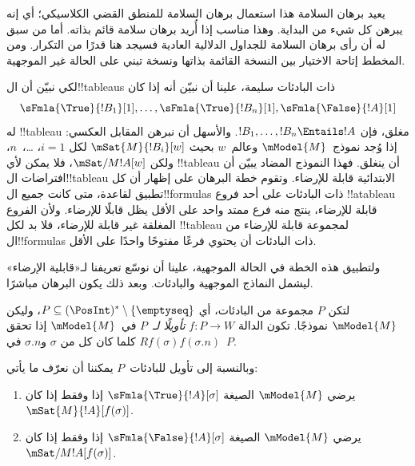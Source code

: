 \documentclass[../../../include/open-logic-section]{subfiles}
\begin{document}


\begin{editorial}
  يعيد برهان السلامة هذا استعمال برهان السلامة للمنطق القضي الكلاسيكي؛
  أي إنه يبرهن كل شيء من البداية. وهذا مناسب إذا أُريد برهان سلامة
  قائم بذاته. أما من سبق له أن رأى برهان السلامة للجداول الدلالية
  العادية فسيجد هنا قدرًا من التكرار. ومن المخطط إتاحة الاختيار بين
  النسخة القائمة بذاتها ونسخة تبني على الحالة غير الموجهية.
\end{editorial}

\begin{explain}
  لكي نبيّن أن ال!!{tableau}s ذات البادئات سليمة، علينا أن نبيّن أنه إذا
  كان
  \[
  \sFmla{\True}{!B_1}[1], \dots, \sFmla{\True}{!B_n}[1], \sFmla{\False}{!A}[1]
  \]
  له !!{tableau} مغلق، فإن $!B_1, \dots, !B_n \Entails !A$. والأسهل
  أن نبرهن المقابل العكسي: إذا وُجد نموذج~$\mModel{M}$ وعالم~$w$ بحيث
  $\mSat{M}{!B_i}[w]$ لكل $i=1$، \dots،~$n$، ولكن
  $\mSat/{M}{!A}[w]$، فلا يمكن لأي !!{tableau} أن ينغلق. فهذا النموذج
  المضاد يبيّن أن افتراضات ال!!{tableau} الابتدائية قابلة للإرضاء.
  وتقوم خطة البرهان على إظهار أن كل تطبيق لقاعدة، متى كانت جميع
  ال!!{formula}s ذات البادئات على أحد فروع !!a{tableau} قابلة للإرضاء،
  ينتج منه فرع ممتد واحد على الأقل يظل قابلًا للإرضاء. ولأن الفروع
  المغلقة غير قابلة للإرضاء، فلا بد لكل !!{tableau} لمجموعة قابلة
  للإرضاء من ال!!{formula}s ذات البادئات أن يحتوي فرعًا مفتوحًا واحدًا
  على الأقل.

  ولتطبيق هذه الخطة في الحالة الموجهية، علينا أن نوسّع تعريفنا
  لـ«قابلية الإرضاء» ليشمل النماذج الموجهية والبادئات. وبعد ذلك يكون
  البرهان مباشرًا.
\end{explain}

\begin{defn}
  لتكن $P$ مجموعة من البادئات، أي $P \subseteq (\PosInt)^*
  \setminus \{\emptyseq\}$، وليكن $\mModel{M}$ نموذجًا. تكون الدالة
  $f\colon P \to W$ \emph{تأويلًا لـ}~$P$ في~$\mModel{M}$ إذا تحقق
  $Rf(\sigma)f(\sigma.n)$ كلما كان كل من $\sigma$ و$\sigma.n$ في~$P$.

  وبالنسبة إلى تأويل للبادئات~$P$ يمكننا أن نعرّف ما يأتي:
  \begin{enumerate}
  \item يرضي $\mModel{M}$ الصيغة $\sFmla{\True}{!A}[\sigma]$ إذا وفقط إذا
    كان $\mSat{M}{!A}[f(\sigma)]$.
  \item يرضي $\mModel{M}$ الصيغة $\sFmla{\False}{!A}[\sigma]$ إذا وفقط إذا
    كان $\mSat/{M}{!A}[f(\sigma)]$.
  \end{enumerate}
\end{defn}
\end{document}
